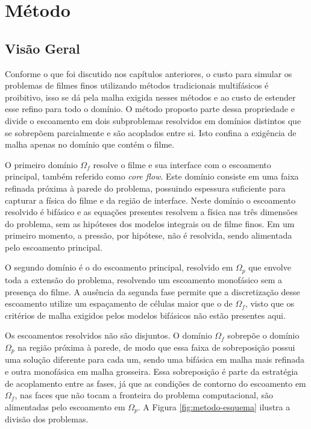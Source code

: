 \chapter{Método}

\section{Visão Geral}
\label{sec:visao-geral}
Conforme o que foi discutido nos capítulos anteriores, o custo para simular os problemas de filmes finos utilizando métodos tradicionais multifásicos é proibitivo, isso se dá pela malha exigida nesses métodos e ao custo de estender esse refino para todo o domínio. O método proposto parte dessa propriedade e divide o escoamento em dois subproblemas resolvidos em domínios distintos que se sobrepõem parcialmente e são acoplados entre si. Isto confina a exigência de malha apenas no domínio que contém o filme.

O primeiro domínio $\Omega_f$ resolve o filme e sua interface com o escoamento principal, também referido como \textit{core flow}. Este domínio consiste em uma faixa refinada próxima à parede do problema, possuindo espessura suficiente para capturar a física do filme e da região de interface. Neste domínio o escoamento resolvido é bifásico e as equações presentes resolvem a física nas três dimensões do problema, sem as hipóteses dos modelos integrais ou de filme finos. Em um primeiro momento, a pressão, por hipótese, não é resolvida, sendo alimentada pelo escoamento principal.

O segundo domínio é o do escoamento principal, resolvido em $\Omega_p$ que envolve toda a extensão do problema, resolvendo um escoamento monofásico sem a presença do filme. A ausência da segunda fase permite que a discretização desse escoamento utilize um espaçamento de células maior que o de $\Omega_f$, visto que os critérios de malha exigidos pelos modelos bifásicos não estão presentes aqui. 

Os escoamentos resolvidos não são disjuntos. O domínio $\Omega_f$ sobrepõe o domínio $\Omega_p$ na região próxima à parede, de modo que essa faixa de sobreposição possui uma solução diferente para cada um, sendo uma bifásica em malha mais refinada e outra monofásica em malha grosseira. Essa sobreposição é parte da estratégia de acoplamento entre as fases, já que as condições de contorno do escoamento em $\Omega_f$, nas faces que não tocam a fronteira do problema computacional, são alimentadas pelo escoamento em $\Omega_p$. A Figura \ref{fig:metodo-esquema} ilustra a divisão dos problemas. 


